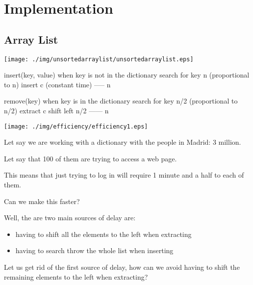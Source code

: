 \documentclass[a4paper, 9pt]{extarticle}
\begin{document}
\newpage

\section{Implementation}

\subsection{Array List}

\begin{center}
  \texttt{[image: ./img/unsortedarraylist/unsortedarraylist.eps]}
\end{center}

\begin{blackboard}
insert(key, value) when key is not in the dictionary
  search for key                              n       (proportional to n)
  insert                                      c       (constant time)
                                             -----
                                              n

remove(key) when key is in the dictionary
  search for key                              n/2     (proportional to n/2)
  extract                                     c
  shift left                                  n/2
                                             ------
                                              n
\end{blackboard}

\begin{multicols}{2}
\begin{center}
  \texttt{[image: ./img/efficiency/efficiency1.eps]}
\end{center}
\columnbreak

Let say we are working with a dictionary with the people in Madrid: 3 million.

Let say that 100 of them are trying to access a web page.

This means that just trying to log in will require 1 minute and a half to each of them.

Can we make this faster?

Well, the are two main sources of delay are:

\begin{itemize}
  \item having to shift all the elements to the left when extracting
  \item having to search throw the whole list when inserting
\end{itemize}

Let us get rid of the first source of delay, how can we avoid having to shift
the remaining elements to the left when extracting?

\end{multicols}
\end{document}

